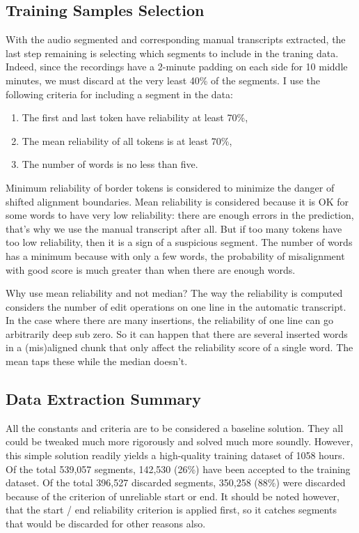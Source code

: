 \documentclass[runningheads]{llncs}
\begin{document}
\subsection{Training Samples Selection}

With the audio segmented and corresponding manual transcripts extracted, the
last step remaining is selecting which segments to include in the traning data.
Indeed, since the recordings have a 2-minute padding on each side for 10 middle
minutes, we must discard at the very least 40\% of the segments. I use the
following criteria for including a segment in the data:

\begin{enumerate}
\item{The first and last token have reliability at least 70\%,}
\item{The mean reliability of all tokens is at least 70\%,}
\item{The number of words is no less than five.}
\end{enumerate}

Minimum reliability of border tokens is considered to minimize the danger of
shifted alignment boundaries. Mean reliability is considered because it is OK
for some words to have very low reliability: there are enough errors in the
prediction, that's why we use the manual transcript after all. But if too many
tokens have too low reliability, then it is a sign of a suspicious segment. The
number of words has a minimum because with only a few words, the probability of
misalignment with good score is much greater than when there are enough words.

Why use mean reliability and not median? The way the reliability is computed
considers the number of edit operations on one line in the automatic transcript.
In the case where there are many insertions, the reliability of one line can go
arbitrarily deep sub zero. So it can happen that there are several inserted
words in a (mis)aligned chunk that only affect the reliability score of a single
word. The mean taps these while the median doesn't.

\subsection{Data Extraction Summary}

All the constants and criteria are to be considered a baseline solution. They
all could be tweaked much more rigorously and solved much more soundly. However,
this simple solution readily yields a high-quality training dataset of 1058
hours. Of the total 539,057 segments, 142,530 (26\%) have been accepted to the
training dataset. Of the total 396,527 discarded segments, 350,258 (88\%) were
discarded because of the criterion of unreliable start or end. It should be
noted however, that the start / end reliability criterion is applied first, so
it catches segments that would be discarded for other reasons also.
\end{document}

